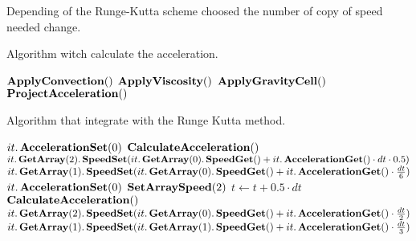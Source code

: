 Depending of the Runge-Kutta scheme choosed the number of copy of speed needed change.

\begin{algorithm}
\caption{Algorithm witch calculate the acceleration.}
\label{code:CalculateAcceleration}
\begin{algorithmic}[1]
   {}
	\State $\mathop{\textbf{ApplyConvection}}()$
	\State $\mathop{\textbf{ApplyViscosity}}()$
	\State $\mathop{\textbf{ApplyGravityCell}}()$
	\State $\mathop{\textbf{ProjectAcceleration}}()$
	\EndProcedure
 \end{algorithmic}
\end{algorithm}

\begin{algorithm}
\caption{Algorithm that integrate with the Runge Kutta method.}
\label{code:RungeKutta}
\begin{algorithmic}[1]
            \State $it.\mathop{\textbf{AccelerationSet}}(0)$
\EndFor
	\State $\mathop{\textbf{CalculateAcceleration}}()$
            \State $it.\mathop{\textbf{GetArray}}(2).\mathop{\textbf{SpeedSet}}(it.\mathop{\textbf{GetArray}}(0).\mathop{\textbf{SpeedGet}}()+it.\mathop{\textbf{AccelerationGet}}()\cdot dt \cdot 0.5)$
            \State $it.\mathop{\textbf{GetArray}}(1).\mathop{\textbf{SpeedSet}}(it.\mathop{\textbf{GetArray}}(0).\mathop{\textbf{SpeedGet}}()+it.\mathop{\textbf{AccelerationGet}}()\cdot \frac{dt}{6})$
        \EndFor
            \State $it.\mathop{\textbf{AccelerationSet}}(0)$
        \EndFor
        \State $\mathop{\textbf{SetArraySpeed}}(2)$
        \State $t\gets t+0.5\cdot dt$
        \State $\mathop{\textbf{CalculateAcceleration}}()$
            \State $it.\mathop{\textbf{GetArray}}(2).\mathop{\textbf{SpeedSet}}(it.\mathop{\textbf{GetArray}}(0).\mathop{\textbf{SpeedGet}}()+it.\mathop{\textbf{AccelerationGet}}()\cdot \frac{dt}{2})$
            \State $it.\mathop{\textbf{GetArray}}(1).\mathop{\textbf{SpeedSet}}(it.\mathop{\textbf{GetArray}}(1).\mathop{\textbf{SpeedGet}}()+it.\mathop{\textbf{AccelerationGet}}()\cdot \frac{dt}{3})$

\end{algorithmic}
\end{algorithm}
